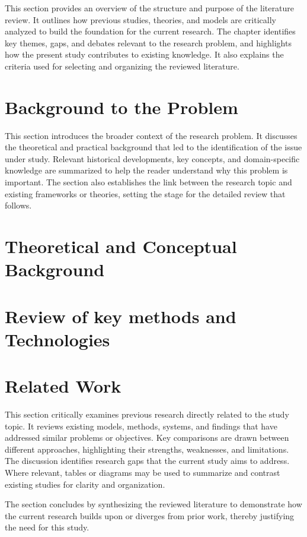 \documentclass[12pt,a4paper]{report}
\begin{document}
This section provides an overview of the structure and purpose of the literature review. 
It outlines how previous studies, theories, and models are critically analyzed to build the foundation for the current research. 
The chapter identifies key themes, gaps, and debates relevant to the research problem, and highlights how the present study contributes to existing knowledge. 
It also explains the criteria used for selecting and organizing the reviewed literature.

\section{Background to the Problem}

This section introduces the broader context of the research problem. 
It discusses the theoretical and practical background that led to the identification of the issue under study. 
Relevant historical developments, key concepts, and domain-specific knowledge are summarized to help the reader understand why this problem is important. 
The section also establishes the link between the research topic and existing frameworks or theories, setting the stage for the detailed review that follows.
\section{Theoretical and Conceptual Background}

\section{Review of key methods and Technologies}


\section{Related Work}

This section critically examines previous research directly related to the study topic. 
It reviews existing models, methods, systems, and findings that have addressed similar problems or objectives. 
Key comparisons are drawn between different approaches, highlighting their strengths, weaknesses, and limitations. 
The discussion identifies research gaps that the current study aims to address. 
Where relevant, tables or diagrams may be used to summarize and contrast existing studies for clarity and organization. 

\noindent The section concludes by synthesizing the reviewed literature to demonstrate how the current research builds upon or diverges from prior work, thereby justifying the need for this study.
\end{document}
